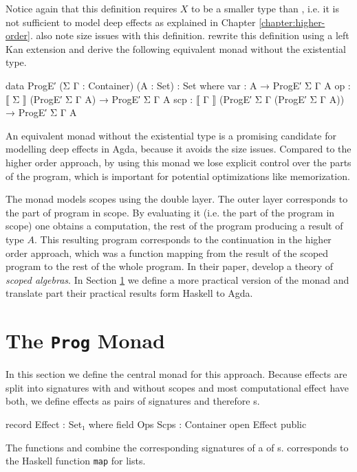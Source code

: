 Notice again that this definition requires $X$ to be a smaller type than
, i.e. it is not sufficient to model deep effects as
explained in Chapter \ref{chapter:higher-order}.
\textcite{DBLP:conf/lics/PirogSWJ18} also note size issues with this definition.
\textcite{DBLP:conf/lics/PirogSWJ18} rewrite this definition using a left Kan
extension and derive the following equivalent monad without the existential
type.

\begin{code}
data ProgE′ (Σ Γ : Container) (A : Set) : Set where
  var  :  A                                   → ProgE′ Σ Γ A
  op   :  ⟦ Σ  ⟧ (ProgE′ Σ Γ A)               → ProgE′ Σ Γ A
  scp  :  ⟦ Γ  ⟧ (ProgE′ Σ Γ (ProgE′ Σ Γ A))  → ProgE′ Σ Γ A
\end{code}
An equivalent monad without the existential type is a promising candidate for
modelling deep effects in Agda, because it avoids the size issues.
Compared to the higher order approach, by using this monad we lose explicit
control over the parts of the program, which is important for potential
optimizations like memorization.

The monad models scopes using the double  layer.
The outer layer corresponds to the part of program in scope.
By evaluating it (i.e. the part of the program in scope) one obtains a
computation, the rest of the program producing a result of type $A$.
This resulting program corresponds to the continuation in the higher order
approach, which was a function mapping from the result of the scoped program
to the rest of the whole program.
In their paper, \textcite{DBLP:conf/lics/PirogSWJ18} develop a theory of
\textit{scoped algebras}.
In Section \ref{scoped-algebra:monad} we define a more practical version of the
monad and translate part their practical results form Haskell to Agda. 


\section{The \texttt{Prog} Monad}
\label{scoped-algebra:monad}

In this section we define the central monad for this approach.
Because effects are split into signatures with and without scopes and most
computational effect have both, we define effects as pairs of signatures and
therefore s.

\begin{code}
record Effect : Set₁ where
  field
    Ops Scps : Container
open Effect public
\end{code}
The functions  and  combine the
corresponding signatures of a  of s.
 corresponds to the Haskell function \texttt{map} for lists.

